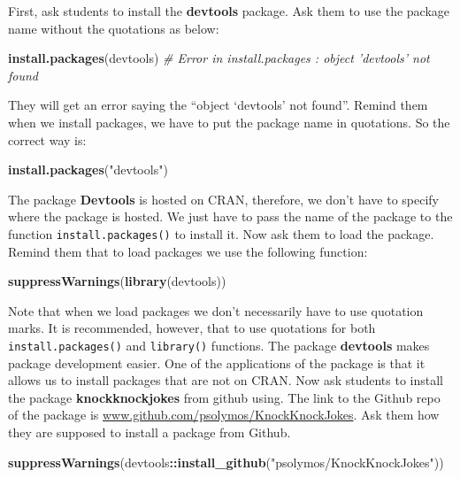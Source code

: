\documentclass[]{book}
\newenvironment{Shaded}{\begin{snugshade}}{\end{snugshade}}
\newcommand{\CommentTok}[1]{\textcolor[rgb]{0.56,0.35,0.01}{\textit{#1}}}
\newcommand{\KeywordTok}[1]{\textcolor[rgb]{0.13,0.29,0.53}{\textbf{#1}}}
\newcommand{\NormalTok}[1]{#1}
\newcommand{\OperatorTok}[1]{\textcolor[rgb]{0.81,0.36,0.00}{\textbf{#1}}}
\newcommand{\StringTok}[1]{\textcolor[rgb]{0.31,0.60,0.02}{#1}}
\begin{document}
First, ask students to install the \textbf{devtools} package. Ask them to use the package name without the quotations as below:

\begin{Shaded}
\begin{Highlighting}[]
\KeywordTok{install.packages}\NormalTok{(devtools)}
\CommentTok{# Error in install.packages : object 'devtools' not found}
\end{Highlighting}
\end{Shaded}

They will get an error saying the ``object `devtools' not found''. Remind them when we install packages, we have to put the package name in quotations. So the correct way is:

\begin{Shaded}
\begin{Highlighting}[]
\KeywordTok{install.packages}\NormalTok{(}\StringTok{"devtools"}\NormalTok{)}
\end{Highlighting}
\end{Shaded}

The package \textbf{Devtools} is hosted on CRAN, therefore, we don't have to specify where the package is hosted. We just have to pass the name of the package to the function \texttt{install.packages()} to install it. Now ask them to load the package. Remind them that to load packages we use the following function:

\begin{Shaded}
\begin{Highlighting}[]
\KeywordTok{suppressWarnings}\NormalTok{(}\KeywordTok{library}\NormalTok{(devtools))}
\end{Highlighting}
\end{Shaded}

Note that when we load packages we don't necessarily have to use quotation marks. It is recommended, however, that to use quotations for both \texttt{install.packages()} and \texttt{library()} functions. The package \textbf{devtools} makes package development easier. One of the applications of the package is that it allows us to install packages that are not on CRAN. Now ask students to install the package \textbf{knockknockjokes} from github using. The link to the Github repo of the package is \url{www.github.com/psolymos/KnockKnockJokes}. Ask them how they are supposed to install a package from Github.

\begin{Shaded}
\begin{Highlighting}[]
\KeywordTok{suppressWarnings}\NormalTok{(devtools}\OperatorTok{::}\KeywordTok{install_github}\NormalTok{(}\StringTok{"psolymos/KnockKnockJokes"}\NormalTok{))}
\end{Highlighting}
\end{Shaded}
\end{document}
